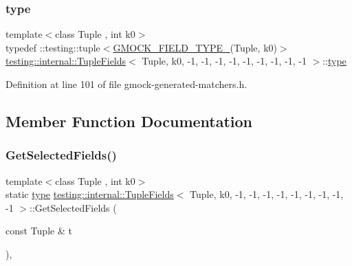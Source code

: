 \subsubsection{\texorpdfstring{type}{type}}
{\footnotesize\ttfamily template$<$class Tuple , int k0$>$ \\
typedef \+::testing\+::tuple$<$\hyperlink{gmock-generated-matchers_8h_acf3e27de83a73f0d873da1cd471e505b}{G\+M\+O\+C\+K\+\_\+\+F\+I\+E\+L\+D\+\_\+\+T\+Y\+P\+E\+\_\+}(Tuple, k0)$>$ \hyperlink{classtesting_1_1internal_1_1TupleFields}{testing\+::internal\+::\+Tuple\+Fields}$<$ Tuple, k0, -\/1, -\/1, -\/1, -\/1, -\/1, -\/1, -\/1, -\/1, -\/1 $>$\+::\hyperlink{classtesting_1_1internal_1_1TupleFields_3_01Tuple_00_01k0_00_01-1_00_01-1_00_01-1_00_01-1_00_01-d80da5b2d6dff94ddefe7f2fc2de778d_aeb08130cf9faa6f43e0453d2c6d9fd04}{type}}



Definition at line 101 of file gmock-\/generated-\/matchers.\+h.



\subsection{Member Function Documentation}
\mbox{\label{classtesting_1_1internal_1_1TupleFields_3_01Tuple_00_01k0_00_01-1_00_01-1_00_01-1_00_01-1_00_01-d80da5b2d6dff94ddefe7f2fc2de778d_a98b0483efb3db67d08269b30b362a510}} 
\subsubsection{\texorpdfstring{Get\+Selected\+Fields()}{GetSelectedFields()}}
{\footnotesize\ttfamily template$<$class Tuple , int k0$>$ \\
static \hyperlink{classtesting_1_1internal_1_1TupleFields_3_01Tuple_00_01k0_00_01-1_00_01-1_00_01-1_00_01-1_00_01-d80da5b2d6dff94ddefe7f2fc2de778d_aeb08130cf9faa6f43e0453d2c6d9fd04}{type} \hyperlink{classtesting_1_1internal_1_1TupleFields}{testing\+::internal\+::\+Tuple\+Fields}$<$ Tuple, k0, -\/1, -\/1, -\/1, -\/1, -\/1, -\/1, -\/1, -\/1, -\/1 $>$\+::Get\+Selected\+Fields (\begin{DoxyParamCaption}\item[{const Tuple \&}]{t }\end{DoxyParamCaption})\hspace{0.3cm}{\ttfamily [inline]}, {\ttfamily [static]}}



